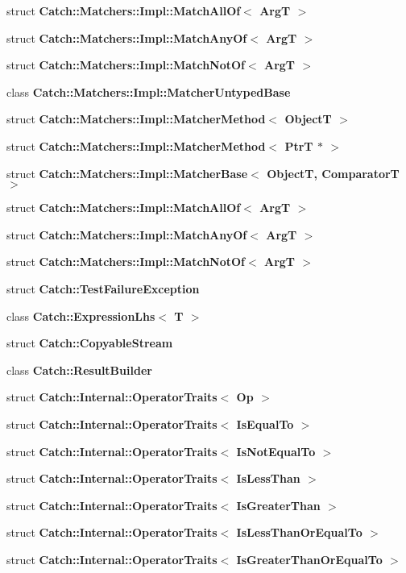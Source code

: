 \begin{DoxyCompactItemize}
struct \textbf{ Catch\+::\+Matchers\+::\+Impl\+::\+Match\+All\+Of$<$ Arg\+T $>$}
\item 
struct \textbf{ Catch\+::\+Matchers\+::\+Impl\+::\+Match\+Any\+Of$<$ Arg\+T $>$}
\item 
struct \textbf{ Catch\+::\+Matchers\+::\+Impl\+::\+Match\+Not\+Of$<$ Arg\+T $>$}
\item 
class \textbf{ Catch\+::\+Matchers\+::\+Impl\+::\+Matcher\+Untyped\+Base}
\item 
struct \textbf{ Catch\+::\+Matchers\+::\+Impl\+::\+Matcher\+Method$<$ Object\+T $>$}
\item 
struct \textbf{ Catch\+::\+Matchers\+::\+Impl\+::\+Matcher\+Method$<$ Ptr\+T $\ast$ $>$}
\item 
struct \textbf{ Catch\+::\+Matchers\+::\+Impl\+::\+Matcher\+Base$<$ Object\+T, Comparator\+T $>$}
\item 
struct \textbf{ Catch\+::\+Matchers\+::\+Impl\+::\+Match\+All\+Of$<$ Arg\+T $>$}
\item 
struct \textbf{ Catch\+::\+Matchers\+::\+Impl\+::\+Match\+Any\+Of$<$ Arg\+T $>$}
\item 
struct \textbf{ Catch\+::\+Matchers\+::\+Impl\+::\+Match\+Not\+Of$<$ Arg\+T $>$}
\item 
struct \textbf{ Catch\+::\+Test\+Failure\+Exception}
\item 
class \textbf{ Catch\+::\+Expression\+Lhs$<$ T $>$}
\item 
struct \textbf{ Catch\+::\+Copyable\+Stream}
\item 
class \textbf{ Catch\+::\+Result\+Builder}
\item 
struct \textbf{ Catch\+::\+Internal\+::\+Operator\+Traits$<$ Op $>$}
\item 
struct \textbf{ Catch\+::\+Internal\+::\+Operator\+Traits$<$ Is\+Equal\+To $>$}
\item 
struct \textbf{ Catch\+::\+Internal\+::\+Operator\+Traits$<$ Is\+Not\+Equal\+To $>$}
\item 
struct \textbf{ Catch\+::\+Internal\+::\+Operator\+Traits$<$ Is\+Less\+Than $>$}
\item 
struct \textbf{ Catch\+::\+Internal\+::\+Operator\+Traits$<$ Is\+Greater\+Than $>$}
\item 
struct \textbf{ Catch\+::\+Internal\+::\+Operator\+Traits$<$ Is\+Less\+Than\+Or\+Equal\+To $>$}
\item 
struct \textbf{ Catch\+::\+Internal\+::\+Operator\+Traits$<$ Is\+Greater\+Than\+Or\+Equal\+To $>$}
\item 

\end{DoxyCompactItemize}
